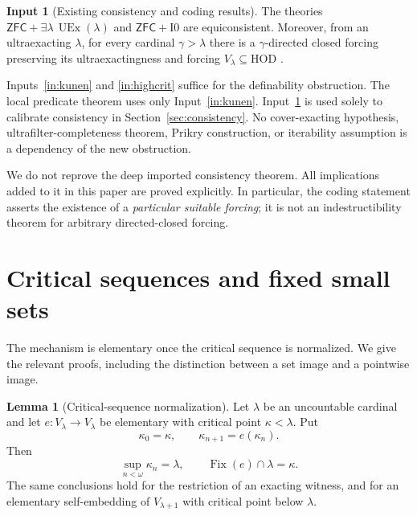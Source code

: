 \documentclass[11pt,letterpaper]{article}
\theoremstyle{definition}
\newtheorem{lemma}[definition]{Lemma}
\newtheorem{inputthm}{Input}
\numberwithin{equation}{section}
\newcommand{\ZFC}{\mathsf{ZFC}}
\newcommand{\HOD}{\mathrm{HOD}}
\newcommand{\UEx}{\operatorname{UEx}}
\newcommand{\Izero}{\mathrm{I0}}
\newcommand{\Fix}{\operatorname{Fix}}
\begin{document}
\begin{inputthm}[Existing consistency and coding results]\label{in:cons}
The theories $\ZFC+\exists\lambda\,\UEx(\lambda)$ and $\ZFC+\Izero$ are equiconsistent. Moreover, from an ultraexacting $\lambda$, for every cardinal $\gamma>\lambda$ there is a $\gamma$-directed closed forcing preserving its ultraexactingness and forcing $V_\lambda\subseteq\HOD$ \cite[Theorem~4.5 and Proposition~3.9]{abgl}.
\end{inputthm}

Inputs~\ref{in:kunen} and \ref{in:highcrit} suffice for the definability obstruction. The local predicate theorem uses only Input~\ref{in:kunen}. Input~\ref{in:cons} is used solely to calibrate consistency in Section~\ref{sec:consistency}. No cover-exacting hypothesis, ultrafilter-completeness theorem, Prikry construction, or iterability assumption is a dependency of the new obstruction.

We do not reprove the deep imported consistency theorem. All implications added to it in this paper are proved explicitly. In particular, the coding statement asserts the existence of a \emph{particular suitable forcing}; it is not an indestructibility theorem for arbitrary directed-closed forcing.

\section{Critical sequences and fixed small sets}\label{sec:fixedsets}

The mechanism is elementary once the critical sequence is normalized. We give the relevant proofs, including the distinction between a set image and a pointwise image.

\begin{lemma}[Critical-sequence normalization]\label{lem:normal}
Let $\lambda$ be an uncountable cardinal and let
$e:V_\lambda\to V_\lambda$ be elementary with critical point $\kappa<\lambda$. Put
\[
 \kappa_0=\kappa,\qquad \kappa_{n+1}=e(\kappa_n).
\]
Then
\begin{equation}\label{eq:normal}
 \sup_{n<\omega}\kappa_n=\lambda,
 \qquad
 \Fix(e)\cap\lambda=\kappa.
\end{equation}
The same conclusions hold for the restriction of an exacting witness, and for an elementary self-embedding of $V_{\lambda+1}$ with critical point below $\lambda$.
\end{lemma}
\end{document}
